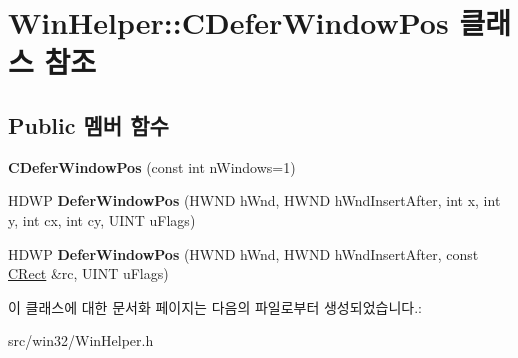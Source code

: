\hypertarget{class_win_helper_1_1_c_defer_window_pos}{}\section{Win\+Helper\+:\+:C\+Defer\+Window\+Pos 클래스 참조}
\label{class_win_helper_1_1_c_defer_window_pos}
\subsection*{Public 멤버 함수}
\begin{DoxyCompactItemize}
\item 
\mbox{\label{class_win_helper_1_1_c_defer_window_pos_ac98b161abd5044c2a2e1e8b8efa0744f}} 
{\bfseries C\+Defer\+Window\+Pos} (const int n\+Windows=1)
\item 
\mbox{\label{class_win_helper_1_1_c_defer_window_pos_a50e9a5dfc382996381a506d66f94efd6}} 
H\+D\+WP {\bfseries Defer\+Window\+Pos} (H\+W\+ND h\+Wnd, H\+W\+ND h\+Wnd\+Insert\+After, int x, int y, int cx, int cy, U\+I\+NT u\+Flags)
\item 
\mbox{\label{class_win_helper_1_1_c_defer_window_pos_aeba6047e5182577c14bfe4729a602ca9}} 
H\+D\+WP {\bfseries Defer\+Window\+Pos} (H\+W\+ND h\+Wnd, H\+W\+ND h\+Wnd\+Insert\+After, const \mbox{\hyperlink{class_win_helper_1_1_c_rect}{C\+Rect}} \&rc, U\+I\+NT u\+Flags)
\end{DoxyCompactItemize}


이 클래스에 대한 문서화 페이지는 다음의 파일로부터 생성되었습니다.\+:\begin{DoxyCompactItemize}
\item 
src/win32/Win\+Helper.\+h\end{DoxyCompactItemize}
